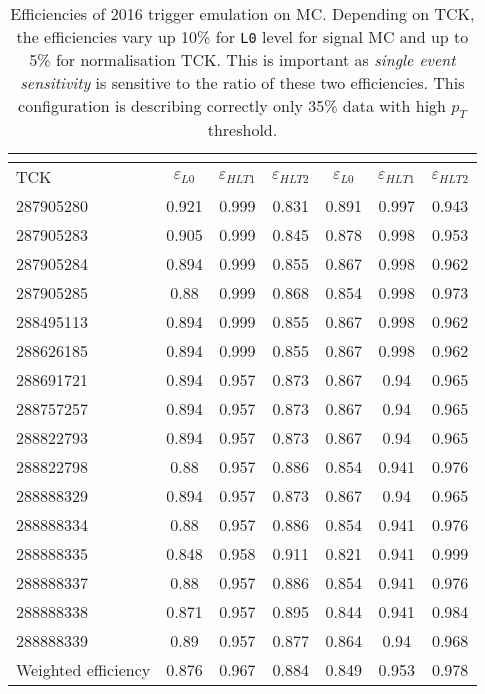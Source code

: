 \begin{table}[H]
\begin{center}
\begin{tabular}{ l |  c  c  c | c  c  c }\toprule
	\multicolumn{1}{c|}{} & \multicolumn{3}{c|}{\Bmumumu } & \multicolumn{3}{c}{\bjpsimumuk} \\ \hline
 TCK & $\varepsilon_{L0}$ & $\varepsilon_{HLT1}$ & $\varepsilon_{HLT2}$ & $\varepsilon_{L0}$ & $\varepsilon_{HLT1}$ & $\varepsilon_{HLT2}$ \\
\hline
287905280 & 0.921 & 0.999 & 0.831 & 0.891 & 0.997 & 0.943 \\
287905283 & 0.905 & 0.999 & 0.845 & 0.878 & 0.998 & 0.953 \\
287905284 & 0.894 & 0.999 & 0.855 & 0.867 & 0.998 & 0.962 \\
287905285 & 0.88 & 0.999 & 0.868 & 0.854 & 0.998 & 0.973 \\
288495113 & 0.894 & 0.999 & 0.855 & 0.867 & 0.998 & 0.962 \\
288626185 & 0.894 & 0.999 & 0.855 & 0.867 & 0.998 & 0.962 \\
288691721 & 0.894 & 0.957 & 0.873 & 0.867 & 0.94 & 0.965 \\
288757257 & 0.894 & 0.957 & 0.873 & 0.867 & 0.94 & 0.965 \\
288822793 & 0.894 & 0.957 & 0.873 & 0.867 & 0.94 & 0.965 \\
288822798 & 0.88 & 0.957 & 0.886 & 0.854 & 0.941 & 0.976 \\
288888329 & 0.894 & 0.957 & 0.873 & 0.867 & 0.94 & 0.965 \\
288888334 & 0.88 & 0.957 & 0.886 & 0.854 & 0.941 & 0.976 \\
288888335 & 0.848 & 0.958 & 0.911 & 0.821 & 0.941 & 0.999 \\
288888337 & 0.88 & 0.957 & 0.886 & 0.854 & 0.941 & 0.976 \\
288888338 & 0.871 & 0.957 & 0.895 & 0.844 & 0.941 & 0.984 \\
288888339 & 0.89 & 0.957 & 0.877 & 0.864 & 0.94 & 0.968 \\
\hline
Weighted efficiency & 0.876 & 0.967 & 0.884 & 0.849 & 0.953 & 0.978 \\
\bottomrule
\end{tabular}
\end{center}
\caption{Efficiencies of 2016 trigger emulation on MC. Depending on TCK, the efficiencies vary up 10\% for \texttt{L0} level for signal MC and up to 5\% for normalisation TCK. This is important as \textit{single event sensitivity} is sensitive to the ratio of these two efficiencies. This configuration is describing correctly only 35\% data with high $p_{T}$ threshold.}
\label{tab:L0andHLT1Calib}
\end{table}



